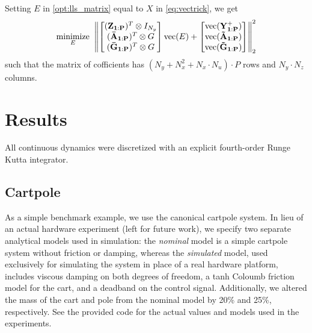 \documentclass{article}
\begin{document}
  Setting $E$ in \eqref{opt:lls_matrix} equal to $X$ in \eqref{eq:vectrick}, we get
  \begin{align} \label{opt:lls_matrix}
      \underset{E}{\text{minimize}} \;\;  
      \norm{
          \begin{bmatrix}
              (\mathbf{Z_{1:P}})^T \otimes I_{N_y} \\
              (\mathbf{\bar{A}_{1:P}})^T \otimes G \\
              (\mathbf{\bar{G}_{1:P}})^T \otimes G \\
          \end{bmatrix}
          \text{vec}(E)
          +
          \begin{bmatrix}
              \text{vec}(\mathbf{Y^+_{1:P}}) \\
              \text{vec}(\mathbf{\tilde{A}_{1:P}}) \\
              \text{vec}(\mathbf{\tilde{G}_{1:P}})
          \end{bmatrix}
      }_2^2
  \end{align}
  such that the matrix of cofficients has $(N_y + N_x^2 + N_x \cdot N_u) \cdot P$ rows and 
  $N_y \cdot N_z$ columns.

\section{Results} \label{sec:results}
All continuous dynamics were discretized with an explicit fourth-order Runge Kutta 
integrator.

\subsection{Cartpole}
As a simple benchmark example, we use the canonical cartpole system. In lieu of an actual 
hardware experiment (left for future work), we specify two separate analytical models used 
in simulation: the \textit{nominal} model is a simple cartpole system without friction or 
damping, whereas the \textit{simulated} model, used exclusively for simulating the system
in place of a real hardware platform, includes viscous damping on both degrees of freedom,
a tanh Coloumb friction model for the cart, and a deadband on the control signal. 
Additionally, we altered the mass of the cart and pole from the nominal model by 20\% and 
25\%, respectively. See the provided code for the actual values and models used in the 
experiments.
\end{document}
